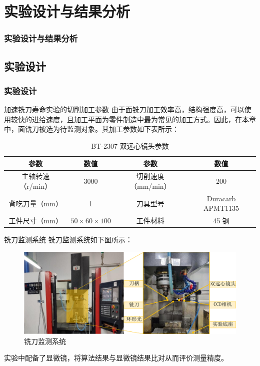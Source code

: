 \documentclass[aspectratio=169,t,xcolor=table,10pt]{ctexbeamer}
\numberwithin{equation}{section} %
\begin{document}
	\section{实验设计与结果分析}
	\begin{frame}
		\frametitle{实验设计与结果分析}
	\end{frame}

	\subsection{实验设计}
	\begin{frame}
		\frametitle{实验设计}
		\begin{block}{加速铣刀寿命实验的切削加工参数}
			\qquad 由于面铣刀加工效率高，结构强度高，可以使用较快的进给速度，且加工平面为零件制造中最为常见的加工方式。因此，在本章中，面铣刀被选为待监测对象。其加工参数如下表所示：
			\begin{table}[H]
				\centering
				\caption{BT-2307 双远心镜头参数}
				\begin{tabular}{cc|cc}
					\toprule[1.5pt]
					参数 & 数值 & 参数 & 数值 \\
					\midrule[0.75pt]
					主轴转速（r/min）  & 3000 & 切削速度（mm/min） & 200 \\
					背吃刀量（mm） & 1 & 刀具型号 & Duracarb APMT1135 \\
					工件尺寸（mm） &  $50\times60\times100$ & 工件材料 & 45 钢 \\
					\bottomrule[1.5pt]
				\end{tabular}
			\end{table}
		\end{block}
	\end{frame}
	
	\begin{frame}
		\begin{block}{铣刀监测系统}
			\qquad 铣刀监测系统如下图所示：
			\begin{figure}[H]
				\centering
				\includegraphics[width=0.8\linewidth]{Figure/shiyanxitong}
				\caption{铣刀监测系统}
			\end{figure}
		
			\qquad 实验中配备了显微镜，将算法结果与显微镜结果比对从而评价测量精度。
		\end{block}
	\end{frame}
	
\end{document}
